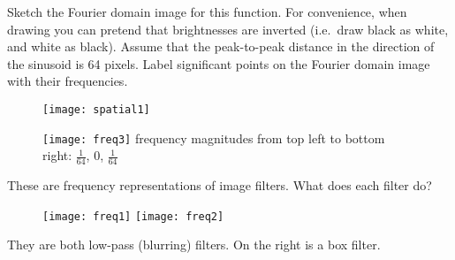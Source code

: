 \begin{blocksection}
\question Sketch the Fourier domain image for this function. For convenience, when drawing you can pretend that brightnesses are inverted (i.e.~draw black as white, and white as black). Assume that the peak-to-peak distance in the direction of the sinusoid is 64 pixels. Label significant points on the Fourier domain image with their frequencies.

\begin{figure}[H]
\centering
\texttt{[image: spatial1]}
\end{figure}

\begin{solution}[0.75in]
\begin{figure}[H]
\centering
\texttt{[image: freq3]}
\:\:\: frequency magnitudes from top left to bottom right: $\frac{1}{64}$, $0$, $\frac{1}{64}$
\end{figure}
\end{solution}
\end{blocksection}


\begin{blocksection}
\question These are frequency representations of image filters. What does each filter do?

\begin{figure}[H]
\centering
\texttt{[image: freq1]} \hspace*{4mm} \texttt{[image: freq2]}
\end{figure}

\begin{solution}[0.75in]
They are both low-pass (blurring) filters. On the right is a box filter.
\end{solution}
\end{blocksection}
